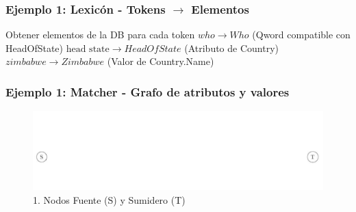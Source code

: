 




\begin{frame}[t]
\frametitle{Ejemplo 1: Lexicón - Tokens $\rightarrow$ Elementos}
Obtener elementos de la DB para cada token\newline
  \Large{
    $who \rightarrow Who$ (Qword compatible con HeadOfState) \newline
    $\text{head state} \rightarrow HeadOfState$ (Atributo de Country) \newline
    $zimbabwe \rightarrow Zimbabwe$ (Valor de Country.Name)\newline
    }
\end{frame}

\begin{frame}
\frametitle{Ejemplo 1: Matcher - Grafo de atributos y valores}
\begin{figure}
  \centering
    \includegraphics[scale=.33]{graficos/presentacion/ejemplo-grafo-matcher-1-2}
    \caption{1. Nodos Fuente (S) y Sumidero (T)}
\end{figure}

\end{frame}

